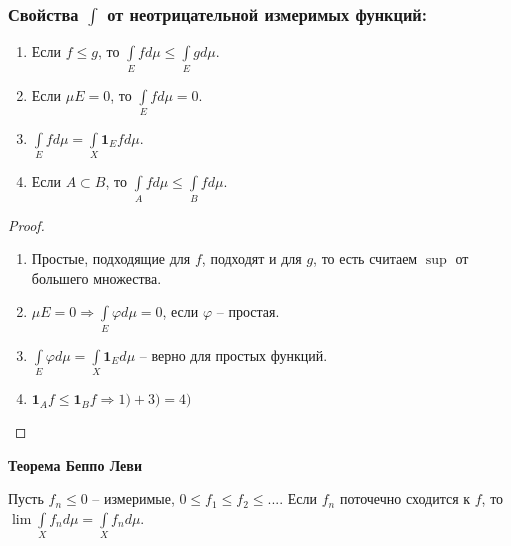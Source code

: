\subsubsection*{Свойства $\int$ от неотрицательной измеримых функций:}

\begin{enumerate}
    \item Если $f\leq g$, то $\int\limits_E fd\mu \leq \int\limits_E gd\mu$.
    
    \item Если $\mu E=0$, то $\int\limits_E fd\mu=0$.
    
    \item $\int\limits_E fd\mu =\int\limits_X \mathbf{1}_E fd\mu$.
    
    \item Если $A\subset B$, то $\int\limits_A fd\mu\leq \int\limits_B fd\mu$.
\end{enumerate}

\begin{proof}~
    \begin{enumerate}
        \item Простые, подходящие для $f$, подходят и для $g$, то есть считаем $\sup$ от большего множества.
        \item $\mu E=0\Rightarrow \int\limits_E \varphi d\mu=0$, если $\varphi$ – простая.
        \item $\int\limits_E \varphi d\mu=\int\limits_X \mathbf{1}_E d\mu$ – верно для простых функций.
        \item $\mathbf{1}_A f\leq \mathbf{1}_B f\Rightarrow 1) + 3) = 4)$
    \end{enumerate}
\end{proof}

\begin{theorem}
    \textbf{Теорема Беппо Леви}

    Пусть $f_n\leq 0$ – измеримые, $0\leq f_1 \leq f_2 \leq ...$. 
    Если $f_n$ поточечно сходится к $f$, то $\lim \int\limits_X f_n d\mu =\int\limits_X f_n d\mu$.
\end{theorem}

